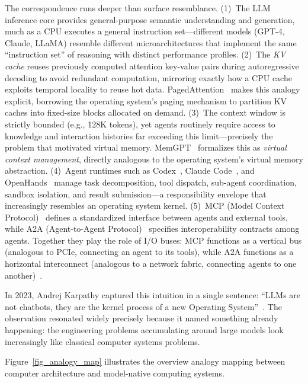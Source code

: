 \documentclass[11pt,a4paper]{article}
\begin{document}
\label{tab:analogy-mapping}

The correspondence runs deeper than surface resemblance.
(1)~The LLM inference core provides general-purpose semantic understanding and generation, much as a CPU executes a general instruction set---different models (GPT-4, Claude, LLaMA) resemble different microarchitectures that implement the same ``instruction set'' of reasoning with distinct performance profiles.
(2)~The \emph{KV cache} reuses previously computed attention key-value pairs during autoregressive decoding to avoid redundant computation, mirroring exactly how a CPU cache exploits temporal locality to reuse hot data.
PagedAttention~\cite{kwon2023pagedattention} makes this analogy explicit, borrowing the operating system's paging mechanism to partition KV caches into fixed-size blocks allocated on demand.
(3)~The context window is strictly bounded (e.g., 128K tokens), yet agents routinely require access to knowledge and interaction histories far exceeding this limit---precisely the problem that motivated virtual memory.
MemGPT~\cite{memgpt2023} formalizes this as \emph{virtual context management}, directly analogous to the operating system's virtual memory abstraction.
(4)~Agent runtimes such as Codex~\cite{openai_codex_overview_2026}, Claude Code~\cite{anthropic_claudecode_overview_2026}, and OpenHands~\cite{openhands_paper_2025} manage task decomposition, tool dispatch, sub-agent coordination, sandbox isolation, and result submission---a responsibility envelope that increasingly resembles an operating system kernel.
(5)~MCP (Model Context Protocol)~\cite{mcp_intro_2026} defines a standardized interface between agents and external tools, while A2A (Agent-to-Agent Protocol)~\cite{google_a2a_2025} specifies interoperability contracts among agents.
Together they play the role of I/O buses: MCP functions as a vertical bus (analogous to PCIe, connecting an agent to its tools), while A2A functions as a horizontal interconnect (analogous to a network fabric, connecting agents to one another)~\cite{agentprotocols2025}.

In 2023, Andrej Karpathy captured this intuition in a single sentence: ``LLMs are not chatbots, they are the kernel process of a new Operating System''~\cite{karpathy2023llmos}.
The observation resonated widely precisely because it named something already happening: the engineering problems accumulating around large models look increasingly like classical computer systems problems.

Figure~\ref{fig_analogy_map} illustrates the overview analogy mapping between computer architecture and model-native computing systems.

\end{document}
